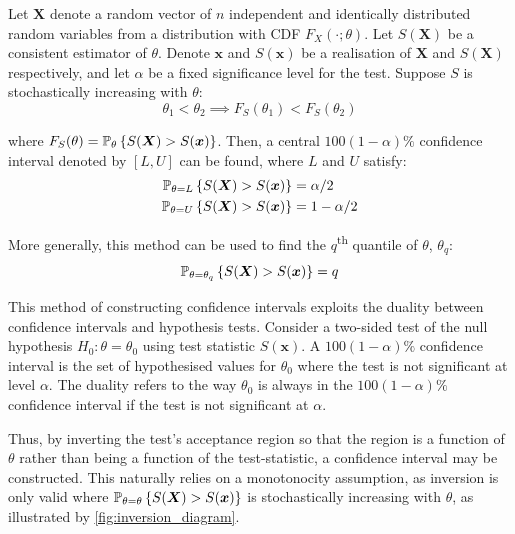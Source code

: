 Let $\bm{X}$ denote a random vector of $n$ independent and identically distributed random variables from a distribution with CDF $F_X (\cdot; \theta)$. Let $S(\bm{X})$ be a consistent estimator of $\theta$. Denote $\bm{x}$ and $S(\bm{x})$ be a realisation of $\bm{X}$ and $S(\bm{X})$ respectively, and let $\alpha$ be a fixed significance level for the test. Suppose $S$ is stochastically increasing with $\theta$:
\begin{equation}
    \theta_1 < \theta_2 \implies F_S(\theta_1) < F_S(\theta_2) 
\end{equation}

where $F_S(\theta) = \mathbb{P}_\theta\left\{S(\bm{X}) > S(\bm{x})\right\}$. Then, a central $100(1-\alpha)\%$ confidence interval denoted by $[L, U]$ can be found, where $L$ and $U$ satisfy: \begin{equation}
\begin{aligned}
    \mathbb{P}_{\theta = L}\left\{S(\bm{X}) > S(\bm{x})\right\} &= \alpha/2 \\
    \mathbb{P}_{\theta = U}\left\{S(\bm{X}) > S(\bm{x})\right\} &= 1 - \alpha/2
\end{aligned}
\end{equation}

More generally, this method can be used to find the $q$\textsuperscript{th} quantile of $\theta$, $\theta_q$: \begin{equation}\label{eq: inversion}
    \mathbb{P}_{\theta = \theta_q}\left\{S(\bm{X}) > S(\bm{x})\right\} = q
\end{equation}

This method of constructing confidence intervals exploits the duality between confidence intervals and hypothesis tests. Consider a two-sided test of the null hypothesis $H_0: \theta = \theta_0$ using test statistic $S(\bm{x})$. A $100(1-\alpha)\%$ confidence interval is the set of hypothesised values for $\theta_0$ where the test is not significant at level $\alpha$. The duality refers to the way $\theta_0$ is always in the $100(1-\alpha)\%$ confidence interval if the test is not significant at $\alpha$.

Thus, by inverting the test's acceptance region so that the region is a function of $\theta$ rather than being a function of the test-statistic, a confidence interval may be constructed. This naturally relies on a monotonocity assumption, as inversion is only valid where $\mathbb{P}_{\theta = \theta}\left\{S(\bm{X}) > S(\bm{x})\right\}$ is stochastically increasing with $\theta$, as illustrated by \autoref{fig:inversion_diagram}.

